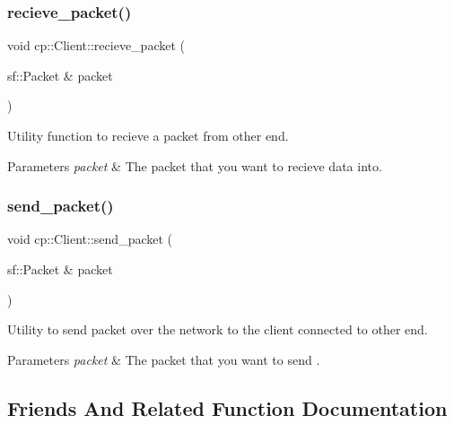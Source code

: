 \subsubsection{\texorpdfstring{recieve\+\_\+packet()}{recieve\_packet()}}
{\footnotesize\ttfamily void cp\+::\+Client\+::recieve\+\_\+packet (\begin{DoxyParamCaption}\item[{sf\+::\+Packet \&}]{packet }\end{DoxyParamCaption})\hspace{0.3cm}{\ttfamily [inline]}}



Utility function to recieve a packet from other end. 


\begin{DoxyParams}{Parameters}
{\em packet} & The packet that you want to recieve data into. \\
\hline
\end{DoxyParams}
\mbox{\label{classcp_1_1_client_a8f0775eeb130ae6aa5cc67978b6e0ca5}} 
\subsubsection{\texorpdfstring{send\+\_\+packet()}{send\_packet()}}
{\footnotesize\ttfamily void cp\+::\+Client\+::send\+\_\+packet (\begin{DoxyParamCaption}\item[{sf\+::\+Packet \&}]{packet }\end{DoxyParamCaption})\hspace{0.3cm}{\ttfamily [inline]}}



Utility to send packet over the network to the client connected to other end. 


\begin{DoxyParams}{Parameters}
{\em packet} & The packet that you want to send . \\
\hline
\end{DoxyParams}


\subsection{Friends And Related Function Documentation}
\mbox{\label{classcp_1_1_client_a5be004df779610d45f3ab82b8d869d19}} 

